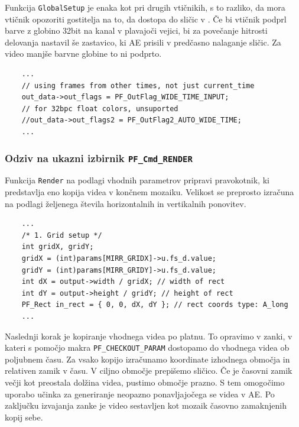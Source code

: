 \documentclass[a4paper, 12pt]{book}
\begin{document}
Funkcija \texttt{GlobalSetup} je enaka kot pri drugih vtičnikih, s to razliko, da mora vtičnik opozoriti gostitelja na to, da dostopa do sličic v .
Če bi vtičnik podprl barve z globino 32bit na kanal v plavajoči vejici, bi za povečanje hitrosti delovanja nastavil še zastavico, ki AE prisili v predčasno nalaganje sličic.
Za video manjše barvne globine to ni podprto.

\begin{verbatim}
    ...
    // using frames from other times, not just current_time
    out_data->out_flags = PF_OutFlag_WIDE_TIME_INPUT; 
    // for 32bpc float colors, unsuported
    //out_data->out_flags2 = PF_OutFlag2_AUTO_WIDE_TIME;
    ...
\end{verbatim}

\subsubsection{Odziv na ukazni izbirnik \texttt{PF\_Cmd\_RENDER}}

Funkcija \texttt{Render} na podlagi vhodnih parametrov pripravi pravokotnik, ki predstavlja eno kopija videa v končnem mozaiku.
Velikost se preprosto izračuna na podlagi željenega števila horizontalnih in vertikalnih ponovitev.

\begin{verbatim}
    ...
    /* 1. Grid setup */
    int gridX, gridY;
    gridX = (int)params[MIRR_GRIDX]->u.fs_d.value;
    gridY = (int)params[MIRR_GRIDY]->u.fs_d.value;
    int dX = output->width / gridX; // width of rect
    int dY = output->height / gridY; // height of rect
    PF_Rect in_rect = { 0, 0, dX, dY }; // rect coords type: A_long
    ...
\end{verbatim}

Naslednji korak je kopiranje vhodnega videa po platnu.
To opravimo v zanki, v kateri s pomočjo makra \texttt{PF\_CHECKOUT\_PARAM} dostopamo do vhodnega videa ob poljubnem času.
Za vsako kopijo izračunamo koordinate izhodnega območja in relativen zamik v času.
V ciljno območje prepišemo sličico.
Če je časovni zamik večji kot preostala dolžina videa, pustimo območje prazno.
S tem omogočimo uporabo učinka za generiranje neopazno ponavljajočega se videa v AE.
Po zaključku izvajanja zanke je video sestavljen kot mozaik časovno zamaknjenih kopij sebe.
\end{document}
